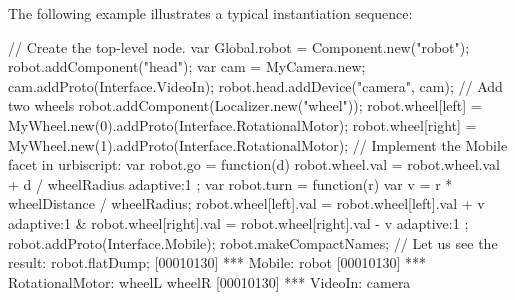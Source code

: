 The following example illustrates a typical instantiation sequence:

\begin{urbiunchecked}
// Create the top-level node.
var Global.robot = Component.new("robot");
robot.addComponent("head");
var cam = MyCamera.new;
cam.addProto(Interface.VideoIn);
robot.head.addDevice("camera", cam);
// Add two wheels
robot.addComponent(Localizer.new("wheel"));
robot.wheel[left] = MyWheel.new(0).addProto(Interface.RotationalMotor);
robot.wheel[right] = MyWheel.new(1).addProto(Interface.RotationalMotor);
// Implement the Mobile facet in urbiscript:
var robot.go = function(d)
{
  robot.wheel.val = robot.wheel.val + d / wheelRadius adaptive:1
};
var robot.turn = function(r)
{
  var v = r * wheelDistance / wheelRadius;
  robot.wheel[left].val = robot.wheel[left].val + v adaptive:1 &
  robot.wheel[right].val = robot.wheel[right].val - v adaptive:1
};
robot.addProto(Interface.Mobile);
robot.makeCompactNames;
// Let us see the result:
robot.flatDump;
[00010130] *** Mobile: robot
[00010130] *** RotationalMotor: wheelL wheelR
[00010130] *** VideoIn: camera
\end{urbiunchecked}

